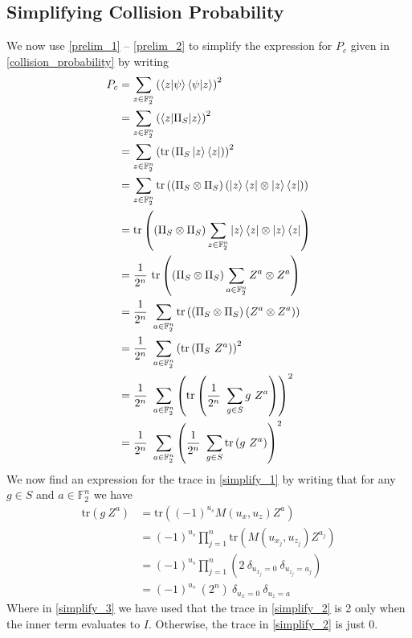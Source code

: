 \documentclass[11pt]{article}
\theoremstyle{definition}
\theoremstyle{plain}
\begin{document}
\subsection{Simplifying Collision Probability}\label{simplifying_cp}
We now use {\ref{prelim_1}} {--} {\ref{prelim_2}} to simplify the expression for $P_c$ given in {\ref{collision_probability}} by writing
\begin{align}
  P_c &= \sum\limits_{z \in \mathbb{F}_2^n}
        {\left( \braket{z | \psi} \braket{\psi | z} \right)}^2 \\
      &= \sum\limits_{z \in \mathbb{F}_2^n}
        {\left( \braket{z | \Pi_S | z} \right)}^2 \\ 
      &= \sum\limits_{z \in \mathbb{F}_2^n}
        {\left( \text{tr}\left(\Pi_S \ket{z} \bra{z}\right) \right)}^2 \\
      &= \sum\limits_{z \in \mathbb{F}_2^n}
        \text{tr}\left( \left(\Pi_S \otimes \Pi_S \right)
        \left(\ket{z} \bra{z} \otimes \ket{z} \bra{z} \right) \right)  \\
      &= \text{tr}\left( \left(\Pi_S \otimes \Pi_S \right)
        \sum\limits_{z \in \mathbb{F}_2^n}
        \ket{z} \bra{z} \otimes \ket{z} \bra{z} \right)  \\
      &= \frac{1}{2^n} \ \text{tr}\left( \left(\Pi_S \otimes \Pi_S \right)
        \sum\limits_{a \in \mathbb{F}_2^n}
        Z^a \otimes Z^a \right)  \\
      &= \frac{1}{2^n} \  \sum\limits_{a \in \mathbb{F}_2^n}
        \text{tr}\left( \left(\Pi_S \otimes \Pi_S \right)
        \left(Z^a \otimes Z^a \right) \right) \\
      &= \frac{1}{2^n} \  \sum\limits_{a \in \mathbb{F}_2^n}
        {\left( \text{tr} \left(\Pi_S \ Z^a \right) \right)}^2 \\
      &= \frac{1}{2^n} \  \sum\limits_{a \in \mathbb{F}_2^n}
        {\left( \text{tr} \left(\frac{1}{2^n} \
        \sum\limits_{g \in S} g \ Z^a \right) \right)}^2 \\
      &= \frac{1}{2^{n}} \  \sum\limits_{a \in \mathbb{F}_2^n}
        {\left( \frac{1}{2^n} \ \sum\limits_{g \in S}
        \text{tr} \left(  g \ Z^a \right) \right)}^2 \label{simplify_1}
\end{align}
We now find an expression for the trace in {\ref{simplify_1}} by writing that for any $g \in S$ and $a \in \mathbb{F}_2^n$ we have
\begin{align}
  \text{tr} \left( g \ Z^a \right)
  &= \text{tr} \left({(-1)}^{u_s} M(u_x, u_z) Z^a \right) \\ 
  &= {(-1)}^{u_s} \prod\limits_{j=1}^n
    \text{tr} \left(M(u_{x_j}, u_{z_j}) Z^{a_j} \right) \label{simplify_2}\\
  &= {(-1)}^{u_s} \prod\limits_{j=1}^n
    ( 2 \ \delta_{u_{x_j}= 0} \ \delta_{u_{z_j}=a_j} ) \label{simplify_3}\\
  &= {(-1)}^{u_s} \ (2^n) \ \delta_{u_x = 0} \ \delta_{u_z = a} \label{simplify_4}
\end{align} 
Where in {\ref{simplify_3}} we have used that the trace in {\ref{simplify_2}} is 2 only when the inner term evaluates to $I$. Otherwise, the trace in {\ref{simplify_2}} is just 0.
\end{document}
